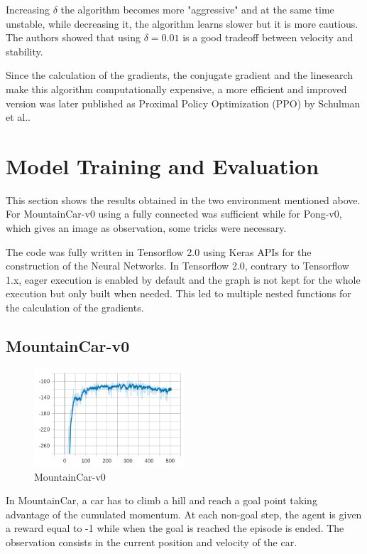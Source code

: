 \documentclass[12pt,a4paper]{article}
\begin{document}
Increasing $\delta$ the algorithm becomes more "aggressive" and at the same time unstable, while decreasing it, the algorithm learns slower but it is more cautious. The authors showed that using $\delta=0.01$ is a good tradeoff between velocity and stability.

Since the calculation of the gradients, the conjugate gradient and the linesearch make this algorithm computationally expensive, a more efficient and improved version was later published as Proximal Policy Optimization (PPO) by Schulman et al..

\section{Model Training and Evaluation}
 
This section shows the results obtained in the two environment mentioned above. For MountainCar-v0 using a fully connected was sufficient while for Pong-v0, which gives an image as observation, some tricks were necessary.

The code was fully written in Tensorflow 2.0 using Keras APIs for the construction of the Neural Networks. In Tensorflow 2.0, contrary to Tensorflow 1.x, eager execution is enabled by default and the graph is not kept for the whole execution but only built when needed. This led to multiple nested functions for the calculation of the gradients.

\subsection{MountainCar-v0}

\begin{figure}[H]
    \centering
    \includegraphics[width=0.5\textwidth]{MountainCar-v0.png}
    \caption{MountainCar-v0}
    \label{fig:MountainCar-v0}
\end{figure}

In MountainCar, a car has to climb a hill and reach a goal point taking advantage of the cumulated momentum. At each non-goal step, the agent is given a reward equal to -1 while when the goal is reached the episode is ended. The observation consists in the current position and velocity of the car.
\end{document}
